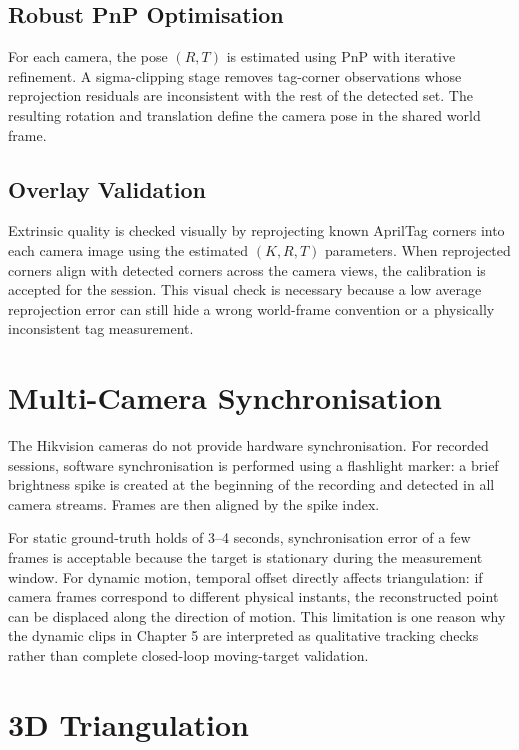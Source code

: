 \subsection{Robust PnP Optimisation}

For each camera, the pose $(R, T)$ is estimated using PnP with iterative refinement. A sigma-clipping stage removes tag-corner observations whose reprojection residuals are inconsistent with the rest of the detected set. The resulting rotation and translation define the camera pose in the shared world frame.

\subsection{Overlay Validation}

Extrinsic quality is checked visually by reprojecting known AprilTag corners into each camera image using the estimated $(K, R, T)$ parameters. When reprojected corners align with detected corners across the camera views, the calibration is accepted for the session. This visual check is necessary because a low average reprojection error can still hide a wrong world-frame convention or a physically inconsistent tag measurement.

\section{Multi-Camera Synchronisation}

The Hikvision cameras do not provide hardware synchronisation. For recorded sessions, software synchronisation is performed using a flashlight marker: a brief brightness spike is created at the beginning of the recording and detected in all camera streams. Frames are then aligned by the spike index.

For static ground-truth holds of 3--4 seconds, synchronisation error of a few frames is acceptable because the target is stationary during the measurement window. For dynamic motion, temporal offset directly affects triangulation: if camera frames correspond to different physical instants, the reconstructed point can be displaced along the direction of motion. This limitation is one reason why the dynamic clips in Chapter 5 are interpreted as qualitative tracking checks rather than complete closed-loop moving-target validation.

\section{3D Triangulation}


